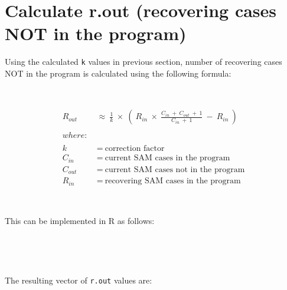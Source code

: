 \documentclass[12pt,a4paper]{article}
\newenvironment{Shaded}{\begin{snugshade}}{\end{snugshade}}
\newcommand{\KeywordTok}[1]{\textcolor[rgb]{0.13,0.29,0.53}{\textbf{#1}}}
\newcommand{\DecValTok}[1]{\textcolor[rgb]{0.00,0.00,0.81}{#1}}
\newcommand{\StringTok}[1]{\textcolor[rgb]{0.31,0.60,0.02}{#1}}
\newcommand{\OperatorTok}[1]{\textcolor[rgb]{0.81,0.36,0.00}{\textbf{#1}}}
\newcommand{\NormalTok}[1]{#1}
\begin{document}
\newpage

\hypertarget{r.out}{%
\section{Calculate r.out (recovering cases NOT in the
program)}\label{r.out}}

Using the calculated \texttt{k} values in previous section, number of
recovering cases NOT in the program is calculated using the following
formula:

~

\[\begin{aligned}
R_{out} & ~ \approx ~ \frac{1}{k} ~ \times ~ \left ( ~ R_{in} ~ \times ~ \frac{C_{in} ~ + ~ C_{out} ~ + ~ 1}{C_{in} ~ + ~ 1} ~ - ~ R_{in} ~ \right ) \\
\\
where: & \\
\\
k & ~ = ~ \text{correction factor} \\
C_{in} & ~ = ~ \text{current SAM cases in the program} \\
C_{out} & ~ = ~ \text{current SAM cases not in the program} \\ 
R_{in} & ~ = ~ \text{recovering SAM cases in the program}
\end{aligned}\]

~

This can be implemented in R as follows:

~

\begin{Shaded}
\end{Shaded}

~

The resulting vector of \texttt{r.out} values are:
\end{document}
